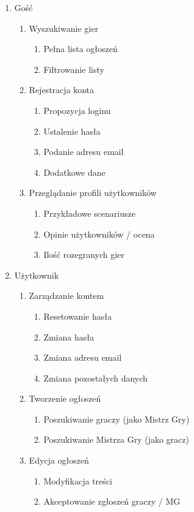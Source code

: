 \begin{enumerate}
\item Gość
	\begin{enumerate}
	\item Wyszukiwanie gier
		\begin{enumerate}
		\item Pełna lista ogłoszeń
		\item Filtrowanie listy
		\end{enumerate}
	\item Rejestracja konta
		\begin{enumerate}
		\item Propozycja loginu
		\item Ustalenie hasła
		\item Podanie adresu email
		\item Dodatkowe dane
		\end{enumerate}
	\item Przeglądanie profili użytkowników
		\begin{enumerate}
		\item Przykładowe scenariusze
		\item Opinie użytkowników / ocena
		\item Ilość rozegranych gier
		\end{enumerate}
	\end{enumerate}
\item Użytkownik
	\begin{enumerate}
	\item Zarządzanie kontem
		\begin{enumerate}
		\item Resetowanie hasła
		\item Zmiana hasła
		\item Zmiana adresu email
		\item Zmiana pozostałych danych
		\end{enumerate}
	\item Tworzenie ogłoszeń
		\begin{enumerate}
		\item Poszukiwanie graczy (jako Mistrz Gry)
		\item Poszukiwanie Mistrza Gry (jako gracz)
		\end{enumerate}
	\item Edycja ogłoszeń
		\begin{enumerate}
		\item Modyfikacja treści
		\item Akceptowanie zgłoszeń graczy / MG

\end{enumerate}
\end{enumerate}
\end{enumerate}
